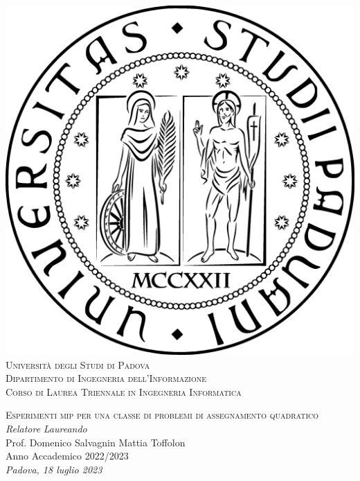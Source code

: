 \documentclass[a4paper,12pt]{book}
\begin{document}
\renewcommand{\contentsname}{\vspace{-2cm} Indice \vspace{-0.5cm}}

\begin{titlepage}

	\begin{center}
	
	\includegraphics[scale=0.11]{images/sigillo.eps} \\ %
	\vspace*{1cm}
	\textsc{\LARGE Università degli Studi di Padova}\\
	\vspace{0.25cm}
	\textsc{\normalsize Dipartimento di Ingegneria dell'Informazione}\\
	\vspace{0.25cm}
	\textsc{\normalsize Corso di Laurea Triennale in Ingegneria Informatica}
	
	\vfill
	\textsc{\LARGE Esperimenti mip per una classe di problemi di assegnamento quadratico}\\

	\vfill
	\vspace*{4cm}
	\textsl{\large Relatore} \hfill \textsl{\large Laureando}\\
	\large Prof. Domenico Salvagnin \hfill Mattia Toffolon\\
	
	\vfill
	{\large Anno Accademico 2022/2023}\\
	\textsl{\large Padova, 18 luglio 2023}
	\end{center}
\end{titlepage}
\end{document}
